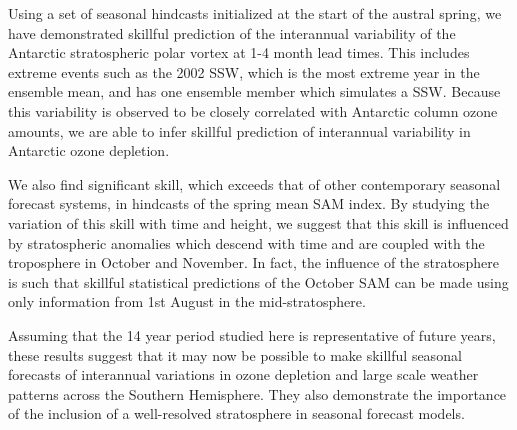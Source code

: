 Using a set of seasonal hindcasts initialized at the start of the austral spring, we have demonstrated skillful prediction of the interannual variability of the Antarctic stratospheric polar vortex at 1-4 month lead times. This includes extreme events such as the 2002 SSW, which is the most extreme year in the ensemble mean, and has one ensemble member which simulates a SSW. Because this variability is observed to be closely correlated with Antarctic column ozone amounts, we are able to infer skillful prediction of interannual variability in Antarctic ozone depletion. 

We also find significant skill, which exceeds that of other contemporary seasonal forecast systems, in hindcasts of the spring mean SAM index.  By studying the variation of this skill with time and height, we suggest that this skill is influenced by stratospheric anomalies which descend with time and are coupled with the troposphere in October and November. In fact, the influence of the stratosphere is such that skillful statistical predictions of the October SAM can be made using only information from 1st August in the mid-stratosphere. 

Assuming that the 14 year period studied here is representative of future years, these results suggest that it may now be possible to make skillful seasonal forecasts of interannual variations in ozone depletion and large scale weather patterns across the Southern Hemisphere. They also demonstrate the importance of the inclusion of a well-resolved stratosphere in seasonal forecast models.

